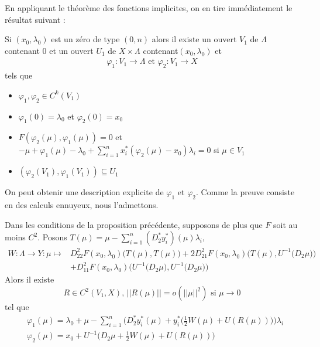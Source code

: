 \documentclass[memoire.tex]{subfiles}
\begin{document}
En appliquant le théorème des fonctions implicites, on en tire  immédiatement le résultat suivant :
\begin{proposition}\label{ApplicationFI}
    Si $(x_0,\lambda_0)$ est un zéro de type $(0,n)$ alors il existe un ouvert $V_1$  de $\Lambda$ contenant $0$ et un ouvert $U_1$  de $X\times \Lambda$ contenant$ (x_0,\lambda_0)$ et
    \begin{align*}
        \varphi_1 : V_1\rightarrow \Lambda \text{ et } \varphi_2 : V_1\rightarrow  X 
    \end{align*}
    tels que
    \begin{itemize}
        \item $\varphi_1,\varphi_2\in C^k(V_1)$
        \item $\varphi_1(0)=\lambda_0$ et $\varphi_2(0)=x_0$
        \item $F(\varphi_2(\mu),\varphi_1(\mu))=0$ et $-\mu +\varphi_1(\mu)-\lambda_0 + \sum_{i=1}^n x_i^{*}(\varphi_2(\mu)-x_0)\lambda_i=0$ si $\mu\in V_1$
        \item $(\varphi_2(V_1),\varphi_1(V_1))\subseteq U_1$
    \end{itemize}
\end{proposition}
On peut obtenir une description explicite de $\varphi_1$ et $\varphi_2$. Comme la preuve consiste en des calculs ennuyeux, nous l’admettons.
\begin{corollaire}
    Dans les conditions de la proposition précédente, supposons de plus que $F$ soit au moins $C^2$. Posons $T(\mu)=\mu-\sum_{i=1}^n (D_2^{*}y_i^{*})(\mu)\lambda_i$,
    \begin{align*}
        W: \Lambda\rightarrow Y: \mu\mapsto 
        &D^2_{22}F(x_0,\lambda_0)\bigg(T(\mu),T(\mu)\bigg)
        +2D_{21}^2F(x_0,\lambda_0)\bigg(T(\mu), U^{-1}\big(D_2\mu\big) \bigg)\\
        &+D^2_{11}F(x_0,\lambda_0)\bigg( U^{-1}\big(D_2\mu\big),U^{-1}\big
        (D_2\mu\big)\bigg)
    \end{align*}
    Alors il existe 
    \begin{equation*}
        R\in C^2( V_1, X)\text{, } ||R(\mu)||=o(||\mu||^2) \text{ si } \mu\rightarrow 0
    \end{equation*}
    tel que
    \begin{align}\label{réécrituresPHI}
        &\varphi_1(\mu)=\lambda_0+\mu-\sum_{i=1}^n\bigg(D_2^{*}y_i^{*}(\mu)+y_i^{*}\big(\frac{1}{2}W(\mu)+U(R(\mu))\big)\bigg)\lambda_i\\
        &\varphi_2(\mu)=x_0+ U^{-1}\bigg(D_2\mu+\frac{1}{2}W(\mu)+U(R(\mu))\bigg)
    \end{align}

\end{corollaire}
\end{document}

